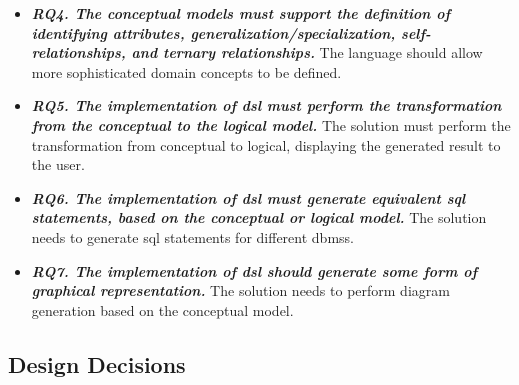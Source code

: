 \begin{itemize}
\item\textit{\textbf{RQ4. The conceptual models must support the definition of identifying attributes, generalization/specialization, self-relationships, and ternary relationships.}}
The language should allow more sophisticated domain concepts to be defined.

\item\textit{\textbf{RQ5. The implementation of \ac{dsl} must perform the transformation from the conceptual to the logical model.}}
The solution must perform the transformation from conceptual to logical, displaying the generated result to the user.

\item\textit{\textbf{RQ6. The implementation of \ac{dsl} must generate equivalent \ac{sql} statements, based on the conceptual or logical model.}}
The solution needs to generate \ac{sql} statements for different \acp{dbms}.

\item\textit{\textbf{RQ7. The implementation of \ac{dsl} should generate some form of graphical representation.}}
The solution needs to perform diagram generation based on the conceptual model.

\end{itemize}

\subsection{Design Decisions} \label{ssec_tool:designDecisions}

